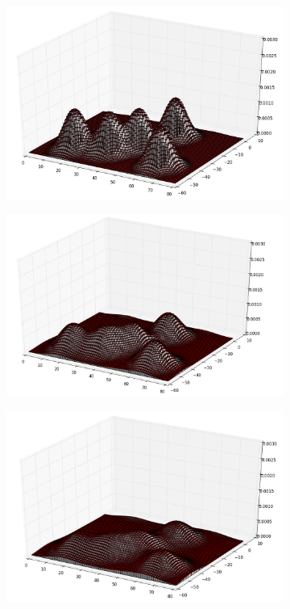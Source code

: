\documentclass[10pt,a4paper]{article}
\begin{document}
\begin{figure}[h!]
	\begin{subfigure}{.3\textwidth}
		\centering
		\includegraphics[width=1\linewidth]{brownian-smoothing-0002.png}
	\end{subfigure}%
	\begin{subfigure}{.3\textwidth}
		\centering
		\includegraphics[width=1\linewidth]{brownian-smoothing-0004.png}
	\end{subfigure}
	\begin{subfigure}{.3\textwidth}
		\centering
		\includegraphics[width=1\linewidth]{brownian-smoothing-0006.png}

\end{subfigure}
\end{figure}
\end{document}
